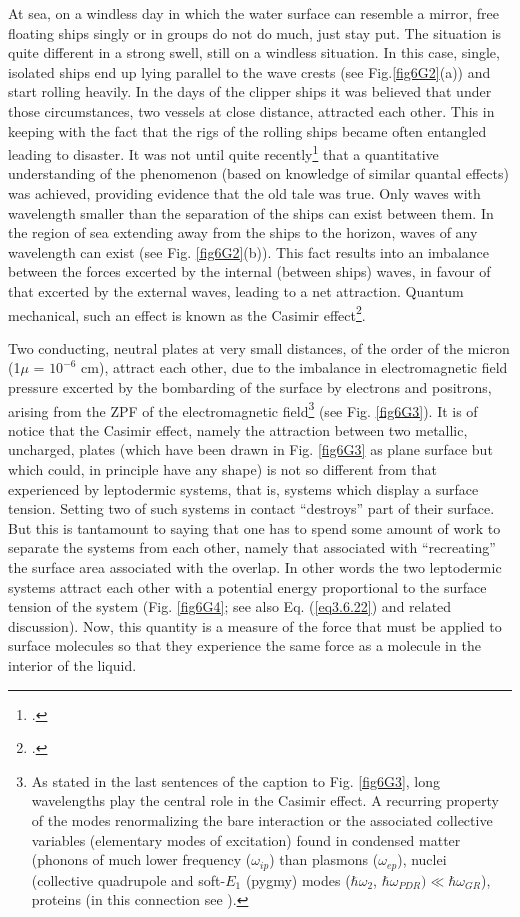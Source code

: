 \begin{subappendices}
At sea, on a windless day in which the water surface can resemble a mirror, free floating
ships singly or in groups do not do much, just stay put. The situation is quite different
in a strong swell, still on a windless situation. In this case, single, isolated ships end up
lying parallel to the wave crests (see Fig.\ref{fig6G2}(a)) and start rolling heavily. In the days
of the clipper ships it was believed that under those circumstances, two vessels at close
distance, attracted each other. This in keeping with the fact that the rigs of the rolling
ships became often entangled leading to disaster. It was not until quite recently\footnote{\cite{Boersma:96}.}
that a quantitative understanding of the phenomenon (based on knowledge of similar quantal
effects) was achieved, providing evidence that the old tale was true.
Only waves with wavelength smaller than the separation of the ships can exist between
them. In the region of sea extending away from the ships to the horizon, waves of any
wavelength can exist (see Fig. \ref{fig6G2}(b)). This fact results into an imbalance between the
forces excerted by the internal (between ships) waves, in favour of that excerted by the
external waves, leading to a net attraction.
Quantum mechanical, such an effect is known as the Casimir effect\footnote{\cite{Casimir:48}.}. 


Two conducting,
neutral plates at very small distances, of the order of the micron (1$\mu$ = $10^{-6}$ cm), attract each
other, due to the imbalance in electromagnetic field pressure excerted by the bombarding
of the surface by electrons and positrons, arising from the ZPF of the electromagnetic field\footnote{As stated in the last sentences of the caption to Fig. \ref{fig6G3}, long wavelengths play the central role in the Casimir effect. A recurring property of the modes renormalizing the bare interaction or the associated collective variables (elementary modes of excitation) found in condensed matter (phonons of much lower frequency ($\omega_{ip}$) than plasmons ($\omega_{ep}$), nuclei (collective quadrupole and soft-$E_1$ (pygmy) modes ($\hbar\omega_2$, $\hbar\omega_{PDR})\ll\hbar\omega_{GR}$), proteins (in this connection see \cite{Micheletti:04,Micheletti:01,Micheletti:02,Hamacher:10}).}
(see Fig. \ref{fig6G3}). It is of notice that the Casimir effect, namely the attraction between two metallic,
uncharged, plates (which have been drawn in Fig. \ref{fig6G3} as plane surface but which could, in
principle have any shape) is not so different from that experienced by leptodermic systems, that is, systems which display a surface tension. Setting two of such systems in contact
``destroys'' part of their surface.  But this is
tantamount to saying that one has to spend some amount of work to separate the systems from each other, namely that
associated with ``recreating'' the surface area associated with the overlap. In other words
the two leptodermic systems attract each other with a potential energy proportional to the
surface tension of the system (Fig. \ref{fig6G4}; see also Eq. (\ref{eq3.6.22}) and related discussion). Now, this quantity is a measure of the force that
must be applied to surface molecules so that they experience the same force as a molecule
in the interior of the liquid.



\end{subappendices}
